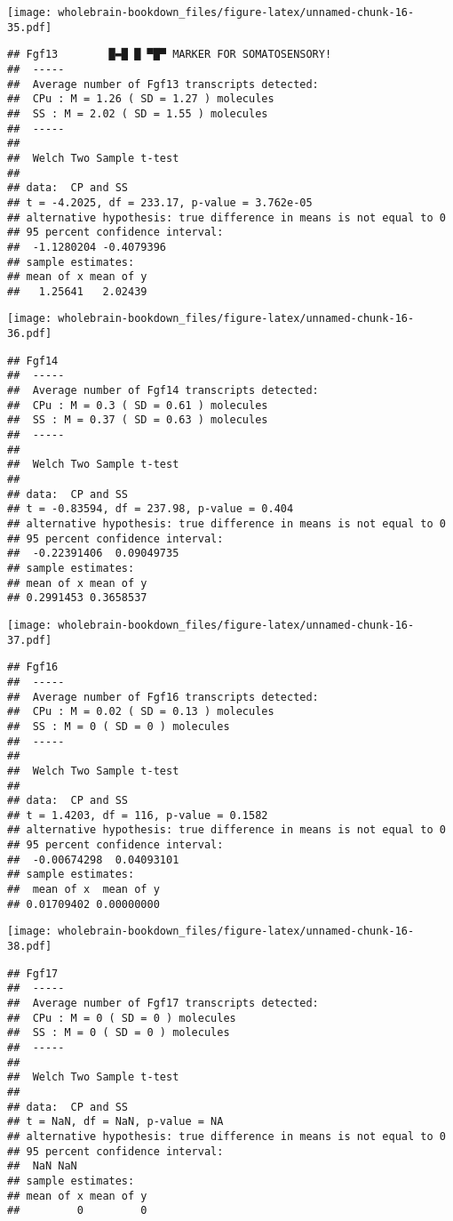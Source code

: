 \documentclass[]{book}
\theoremstyle{definition}
\theoremstyle{definition}
\theoremstyle{remark}
\begin{document}
\texttt{[image: wholebrain-bookdown\_files/figure-latex/unnamed-chunk-16-35.pdf]}

\begin{verbatim}
## Fgf13        █▬█ █ ▀█▀ MARKER FOR SOMATOSENSORY!
##  -----
##  Average number of Fgf13 transcripts detected:
##  CPu : M = 1.26 ( SD = 1.27 ) molecules 
##  SS : M = 2.02 ( SD = 1.55 ) molecules
##  -----
## 
##  Welch Two Sample t-test
## 
## data:  CP and SS
## t = -4.2025, df = 233.17, p-value = 3.762e-05
## alternative hypothesis: true difference in means is not equal to 0
## 95 percent confidence interval:
##  -1.1280204 -0.4079396
## sample estimates:
## mean of x mean of y 
##   1.25641   2.02439
\end{verbatim}

\texttt{[image: wholebrain-bookdown\_files/figure-latex/unnamed-chunk-16-36.pdf]}

\begin{verbatim}
## Fgf14
##  -----
##  Average number of Fgf14 transcripts detected:
##  CPu : M = 0.3 ( SD = 0.61 ) molecules 
##  SS : M = 0.37 ( SD = 0.63 ) molecules
##  -----
## 
##  Welch Two Sample t-test
## 
## data:  CP and SS
## t = -0.83594, df = 237.98, p-value = 0.404
## alternative hypothesis: true difference in means is not equal to 0
## 95 percent confidence interval:
##  -0.22391406  0.09049735
## sample estimates:
## mean of x mean of y 
## 0.2991453 0.3658537
\end{verbatim}

\texttt{[image: wholebrain-bookdown\_files/figure-latex/unnamed-chunk-16-37.pdf]}

\begin{verbatim}
## Fgf16
##  -----
##  Average number of Fgf16 transcripts detected:
##  CPu : M = 0.02 ( SD = 0.13 ) molecules 
##  SS : M = 0 ( SD = 0 ) molecules
##  -----
## 
##  Welch Two Sample t-test
## 
## data:  CP and SS
## t = 1.4203, df = 116, p-value = 0.1582
## alternative hypothesis: true difference in means is not equal to 0
## 95 percent confidence interval:
##  -0.00674298  0.04093101
## sample estimates:
##  mean of x  mean of y 
## 0.01709402 0.00000000
\end{verbatim}

\texttt{[image: wholebrain-bookdown\_files/figure-latex/unnamed-chunk-16-38.pdf]}

\begin{verbatim}
## Fgf17
##  -----
##  Average number of Fgf17 transcripts detected:
##  CPu : M = 0 ( SD = 0 ) molecules 
##  SS : M = 0 ( SD = 0 ) molecules
##  -----
## 
##  Welch Two Sample t-test
## 
## data:  CP and SS
## t = NaN, df = NaN, p-value = NA
## alternative hypothesis: true difference in means is not equal to 0
## 95 percent confidence interval:
##  NaN NaN
## sample estimates:
## mean of x mean of y 
##         0         0
\end{verbatim}
\end{document}
